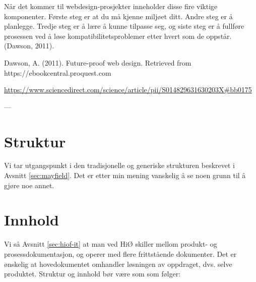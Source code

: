 Når det kommer til webdesign-prosjekter inneholder disse fire viktige komponenter. Første steg er at du må kjenne miljøet ditt. Andre steg er å planlegge. Tredje steg er å lære å kunne tilpasse seg, og siste steg er å fullføre prosessen ved å løse kompatibilitetsproblemer etter hvert som de oppstår. (Dawson, 2011).

Dawson, A. (2011). Future-proof web design. Retrieved from https://ebookcentral.proquest.com

\url{https://www.sciencedirect.com/science/article/pii/S014829631630203X#bb0175 }


---

\section{Struktur}

Vi tar utgangspunkt i den tradisjonelle og generiske strukturen beskrevet i Avsnitt \ref{sec:mayfield}. Det er etter min mening vanskelig å se noen grunn til å gjøre noe annet.

\section{Innhold}

Vi så Avsnitt \ref{sec:hiof-it}  at man ved HiØ skiller mellom produkt- og prosessdokumentasjon, og operer med flere frittstående dokumenter. Det er ønskelig at hovedokumentet omhandler løsningen av oppdraget, dvs. selve produktet.
Struktur og innhold bør være som som følger:

